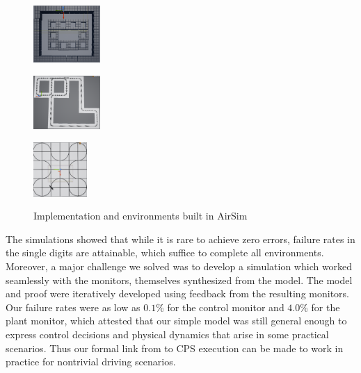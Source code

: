 \documentclass[12pt]{cmuthesis}
\theoremstyle{definition}
\theoremstyle{remark}
\begin{document}
\begin{figure}[tb]
\begin{minipage}[b]{0.15\textwidth}
\includegraphics[width=1in]{graphics/screen1.png}
\label{fig:rect}\end{minipage}
\begin{minipage}[b]{0.15\textwidth}\centering
\includegraphics[width=1in]{graphics/screen2.png}
\label{fig:turns}\end{minipage}
\begin{minipage}[b]{0.15\textwidth}\centering
\includegraphics[width=0.8in]{graphics/screen3.png}
\label{fig:clover}\end{minipage}
\caption{Implementation and environments built in AirSim}
\label{fig:patrol-plan}
\end{figure}
The simulations showed that while it is rare to achieve zero errors, failure rates in the single digits are attainable, which suffice to complete all environments.
Moreover, a major challenge we solved was to develop a simulation which worked seamlessly with the monitors, themselves synthesized from the model.
The model and proof were iteratively developed using feedback from the resulting monitors.
Our failure rates were as low as $0.1$\% for the control monitor and $4.0$\% for the plant monitor, which attested that our simple model was still general enough to express control decisions and physical dynamics that arise in some practical scenarios.
Thus our formal link from \dL to CPS execution can be made to work in practice for nontrivial driving scenarios.
\end{document}
